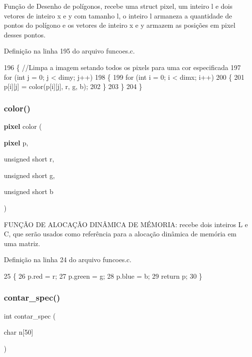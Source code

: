 Função de Desenho de polígonos, recebe uma struct pixel, um inteiro l e dois vetores de inteiro x e y com tamanho l, o inteiro l armaneza a quantidade de pontos do polígono e os vetores de inteiro x e y armazem as posições em pixel desses pontos. 



Definição na linha 195 do arquivo funcoes.\+c.


\begin{DoxyCode}
196 \{ \textcolor{comment}{//Limpa a imagem setando todos os pixels para uma cor especificada}
197     \textcolor{keywordflow}{for} (\textcolor{keywordtype}{int} j = 0; j < dimy; j++)
198     \{
199         \textcolor{keywordflow}{for} (\textcolor{keywordtype}{int} i = 0; i < dimx; i++)
200         \{
201             p[i][j] = color(p[i][j], r, g, b);
202         \}
203     \}
204 \}
\end{DoxyCode}
\mbox{\label{funcoes_8h_ad177adc333f3b3216ad99954f57dcde0}} 
\subsubsection{color()}
{\footnotesize\ttfamily \textbf{ pixel} color (\begin{DoxyParamCaption}\item[{\textbf{ pixel}}]{p,  }\item[{unsigned short}]{r,  }\item[{unsigned short}]{g,  }\item[{unsigned short}]{b }\end{DoxyParamCaption})}



F\+U\+NÇÃO DE A\+L\+O\+C\+AÇÃO D\+I\+NÂ\+M\+I\+CA DE MÉ\+M\+O\+R\+IA\+: recebe dois inteiros L e C, que serão usados como referência para a alocação dinâmica de memória em uma matriz. 



Definição na linha 24 do arquivo funcoes.\+c.


\begin{DoxyCode}
25 \{
26     p.red = r;
27     p.green = g;
28     p.blue = b;
29     \textcolor{keywordflow}{return} p;
30 \}
\end{DoxyCode}
\mbox{\label{funcoes_8h_a5f3b3425ca4ce2be5043883294c4e497}} 
\subsubsection{contar\+\_\+spec()}
{\footnotesize\ttfamily int contar\+\_\+spec (\begin{DoxyParamCaption}\item[{char}]{n[50] }\end{DoxyParamCaption})}



